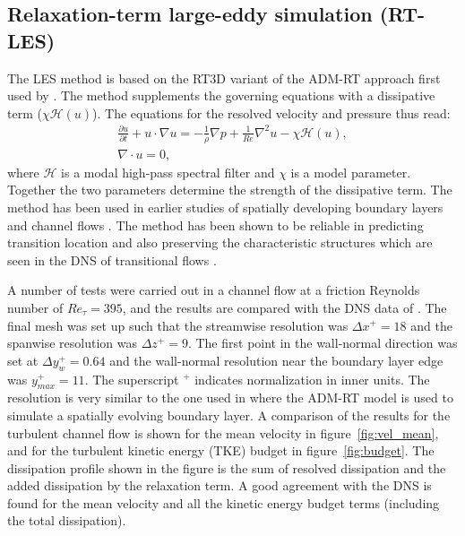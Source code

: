 \subsection{Relaxation-term large-eddy simulation (RT-LES)}

The LES method is based on the RT3D variant of the ADM-RT approach first used by \cite{schlatter04}. The method supplements the governing equations with a dissipative term ($\chi\mathcal{H}(u)$). The equations for the resolved velocity and pressure thus read:
\begin{subequations}
	\begin{eqnarray}
		\frac{\partial u}{\partial t} + u\cdot\nabla u =  - \frac{1}{\rho}\nabla p + \frac{1}{Re}\nabla^{2}u -\chi\mathcal{H}(u), \\
		\nabla\cdot u = 0,
	\end{eqnarray}
\end{subequations}
where $\mathcal{H}$ is a modal high-pass spectral filter and $\chi$ is a model parameter. Together the two parameters determine the strength of the dissipative term. The method has been used in earlier studies of spatially developing boundary layers \citep{eitel14} and channel flows \citep{schlatter06}. The method has been shown to be reliable in predicting transition location and also preserving the characteristic structures which are seen in the DNS of transitional flows \citep{schlatter06}.

A number of tests were carried out in a channel flow at a friction Reynolds number of $Re_{\tau}=395$, and the results are compared with the DNS data of \cite{moser99}. The final mesh was set up such that the streamwise resolution was $\Delta x^{+}=18$ and the spanwise resolution was $\Delta z^{+}=9$. The first point in the wall-normal direction was set at $\Delta y_{w}^{+}=0.64$ and the wall-normal resolution near the boundary layer edge was $y_{max}^{+}=11$. The superscript $^{+}$ indicates normalization in inner units. The resolution is very similar to the one used in \cite{eitel14} where the ADM-RT model is used to simulate a spatially evolving boundary layer. A comparison of the results for the turbulent channel flow is shown for the mean velocity in figure~\ref{fig:vel_mean}, and for the turbulent kinetic energy (TKE) budget in figure~\ref{fig:budget}. The dissipation profile shown in the figure is the sum of resolved dissipation and the added dissipation by the relaxation term. A good agreement with the DNS is found for the mean velocity and all the kinetic energy budget terms (including the total dissipation).

